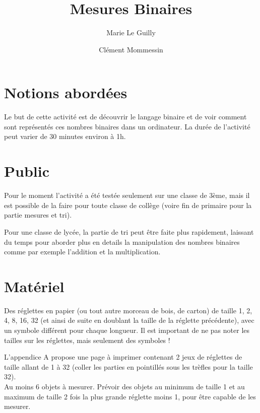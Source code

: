 \documentclass[a4paper,12pt]{scrartcl}
\begin{document}
\title{Mesures Binaires}
\author{Marie Le Guilly \and Clément Mommessin}

\maketitle

\section{Notions abordées}

Le but de cette activité est de découvrir le langage binaire et de voir comment sont représentés ces nombres binaires dans un ordinateur.
La durée de l'activité peut varier de 30 minutes environ à 1h.


\section{Public}

Pour le moment l'activité a été testée seulement sur une classe de 3ème, mais il est possible de la faire pour toute classe de collège (voire fin de primaire pour la partie mesures et tri).

Pour une classe de lycée, la partie de tri peut être faite plus rapidement, laissant du temps pour aborder plus en details la manipulation des nombres binaires comme par exemple l'addition et la multiplication.



\section{Matériel}

Des réglettes en papier (ou tout autre morceau de bois, de carton) de taille 1, 2, 4, 8, 16, 32 (et ainsi de suite en doublant la taille de la réglette précédente), avec un symbole différent pour chaque longueur. Il est important de ne pas noter les tailles sur les réglettes, mais seulement des symboles !

L'appendice A propose une page à imprimer contenant 2 jeux de réglettes de taille allant de 1 à 32 (coller les parties en pointillés sous les trèfles pour la taille 32).\\


Au moins 6 objets à mesurer. Prévoir des objets au minimum de taille 1 et au maximum de taille 2 fois la plus grande réglette moins 1, pour être capable de les mesurer.
\end{document}
